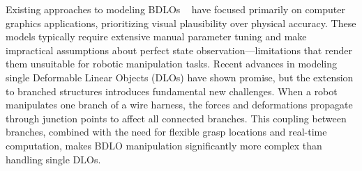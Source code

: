 Existing approaches to modeling BDLOs ~\cite{originalDER, baseline1, bdlo_modeling1, bdlo_modeling2} have focused primarily on computer graphics applications, prioritizing visual plausibility over physical accuracy. 
These models typically require extensive manual parameter tuning and make impractical assumptions about perfect state observation—limitations that render them unsuitable for robotic manipulation tasks. 
Recent advances in modeling single Deformable Linear Objects (DLOs) \cite{DEFORM, xpbd, directionalrigidity, bi-LSTM_baseline, GNN_baseline} have shown promise, but the extension to branched structures introduces fundamental new challenges.
When a robot manipulates one branch of a wire harness, the forces and deformations propagate through junction points to affect all connected branches.
This coupling between branches, combined with the need for flexible grasp locations and real-time computation, makes BDLO manipulation significantly more complex than handling single DLOs.


